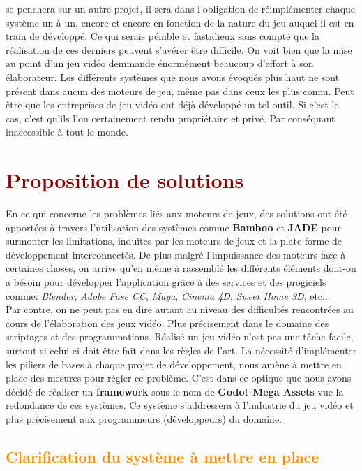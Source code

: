 \documentclass[ebook, 8pt, oneside, openany]{memoir}
\begin{document}
	se penchera sur un autre projet, il sera dans l'obligation de réimplémenter chaque système un à un,
	encore et encore en fonction de la nature du jeu auquel il est en train de développé. Ce qui serais
	pénible et fastidieux sans compté que la réalisation de ces derniers peuvent s'avérer être difficile. On
	voit bien que la mise au point d'un jeu vidéo demmande énormément beaucoup d'effort à son élaborateur.
	Les différents systèmes que nous avons évoqués plus haut ne sont présent dans aucun des moteurs de jeu,
	même pas dans ceux les plus connu. Peut être que les entreprises de jeu vidéo ont déjà développé un tel
	outil. Si c'est le cas, c'est qu'ils l'on certainement rendu propriétaire et privé. Par conséquant
	inaccessible à tout le monde.	
	
	\section{\textcolor{darkred}{Proposition de solutions}}
	En ce qui concerne les problèmes liés aux moteurs de jeux, des solutions ont été apportées à travers
	l'utilisation des systèmes comme \textbf{Bamboo} et \textbf{JADE} pour surmonter les limitations,
	induites par les moteurs de jeux et la plate-forme de développement interconnectés. De plus malgré
	l'impuissance des moteurs face à certaines choses, on arrive qu'en même à rassemblé les différents
	éléments dont-on a bésoin pour développer l'application grâce à des services et des progiciels comme:
	\textit{Blender}, \textit{Adobe Fuse CC}, \textit{Maya}, \textit{Cinema 4D}, \textit{Sweet Home 3D},
	etc...\\
	Par contre, on ne peut pas en dire autant au niveau des difficultés rencontrées au cours de
	l'élaboration des jeux vidéo. Plus précisement dans le domaine des scriptages et des programmations.
	Réalisé un jeu vidéo n'est pas une tâche facile, surtout si celui-ci doit être fait dans les règles de
	l'art. La nécessité d'implémenter les piliers de bases à chaque projet de développement, nous amène à 
	mettre en place des mesures pour régler ce problème. C'est dans ce optique que nous avons décidé de
	réaliser un \textbf{framework} sous le nom de \textbf{Godot Mega Assets} vue la redondance de ces
	systèmes. Ce système s'addressera à l'industrie du jeu vidéo et plus précisement aux programmeurs
	(développeurs) du domaine.
	\subsection{\textcolor{darkorange}{Clarification du système à mettre en place}}
\end{document}
